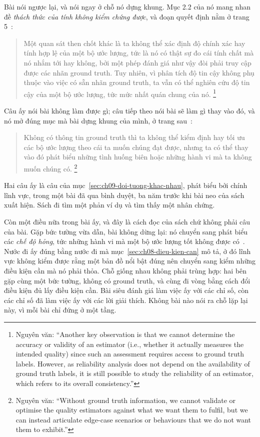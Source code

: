 %
Bài nói ngược lại, và nói ngay ở chỗ nó dựng khung. Mục 2.2 của nó mang nhan đề
\emph{thách thức của tính không kiểm chứng được}, và đoạn quyết định nằm ở trang
5~\autocite{mmetaquantus}:

\begin{quote}
Một quan sát then chốt khác là ta không thể xác định độ chính xác hay tính hợp lệ
của một bộ ước lượng, tức là nó có thật sự đo cái tính chất mà nó nhắm tới hay
không, bởi một phép đánh giá như vậy đòi phải truy cập được các nhãn ground
truth. Tuy nhiên, vì phân tích độ tin cậy không phụ thuộc vào việc có sẵn nhãn
ground truth, ta vẫn có thể nghiên cứu độ tin cậy của một bộ ước lượng, tức mức
nhất quán chung của nó.%
\footnote{Nguyên văn: \enquote{Another key observation is that we cannot determine
the accuracy or validity of an estimator (i.e., whether it actually measures the
intended quality) since such an assessment requires access to ground truth labels.
However, as reliability analysis does not depend on the availability of ground
truth labels, it is still possible to study the reliability of an estimator, which
refers to its overall consistency.}}
\end{quote}

Câu ấy nói bài không làm được gì; câu tiếp theo nói bài sẽ làm gì thay vào đó, và
nó mở đúng mục mà bài dựng khung của mình, ở trang
sau~\autocite{mmetaquantus}:

\begin{quote}
Không có thông tin ground truth thì ta không thể kiểm định hay tối ưu các bộ ước
lượng theo cái ta muốn chúng đạt được, nhưng ta có thể thay vào đó phát biểu
những tình huống biên hoặc những hành vi mà ta không muốn chúng có.%
\footnote{Nguyên văn: \enquote{Without ground truth information, we cannot validate
or optimise the quality estimators against what we want them to fulfil, but we can
instead articulate edge-case scenarios or behaviours that we do not want them to
exhibit.}}
\end{quote}

Hai câu ấy là câu của mục~\ref{sec:ch09-doi-tuong-khac-nhau}, phát biểu bởi chính
lĩnh vực, trong một bài đã qua bình duyệt, ba năm trước khi bài neo của sách xuất
hiện. Sách đi tìm một phản ví dụ và tìm thấy một nhân chứng.

%
Còn một điều nữa trong bài ấy, và đây là cách đọc của sách chứ không phải câu của
bài. Gặp bức tường vừa dẫn, bài không dừng lại: nó chuyển sang phát biểu các
\emph{chế độ hỏng}, tức những hành vi mà một bộ ước lượng tốt không được
có~\autocite{mmetaquantus}. Nước đi ấy đúng bằng nước đi mà
mục~\ref{sec:ch08-dieu-kien-can} mô tả, ở đó lĩnh vực không kiểm được rằng một
bản đồ nổi bật đúng nên chuyển sang kiểm những điều kiện cần mà nó phải thỏa. Chỗ
giống nhau không phải trùng hợp: hai bên gặp cùng một bức tường, không có ground
truth, và cùng đi vòng bằng cách đổi điều kiện đủ lấy điều kiện cần. Bài siêu
đánh giá làm việc ấy với các chỉ số, còn các chỉ số đã làm việc ấy với các lời
giải thích. Không bài nào nói ra chỗ lặp lại này, vì mỗi bài chỉ đứng ở một tầng.

